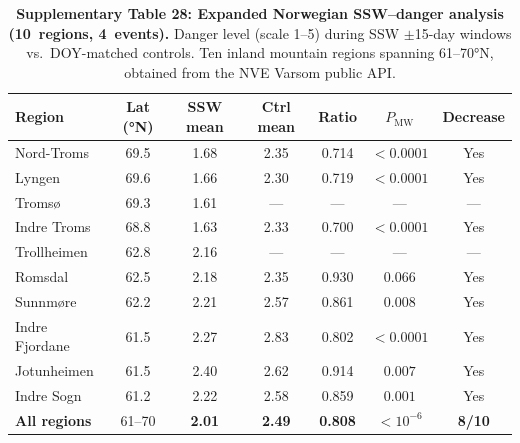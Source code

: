 \begin{table}[htbp]
\caption{\textbf{Supplementary Table 28: Expanded Norwegian SSW--danger analysis (10~regions, 4~events).}
Danger level (scale 1--5) during SSW $\pm$15-day windows vs.\ DOY-matched controls. Ten inland mountain regions spanning 61--70°N, obtained from the NVE Varsom public API.}
\label{tab:norway_expanded}
\small
\begin{tabular}{lcccccc}
\toprule
Region & Lat (°N) & SSW mean & Ctrl mean & Ratio & $P_{\mathrm{MW}}$ & Decrease \\
\midrule
Nord-Troms & 69.5 & 1.68 & 2.35 & 0.714 & $< 0.0001$ & Yes \\
Lyngen & 69.6 & 1.66 & 2.30 & 0.719 & $< 0.0001$ & Yes \\
Tromsø & 69.3 & 1.61 & --- & --- & --- & --- \\
Indre Troms & 68.8 & 1.63 & 2.33 & 0.700 & $< 0.0001$ & Yes \\
Trollheimen & 62.8 & 2.16 & --- & --- & --- & --- \\
Romsdal & 62.5 & 2.18 & 2.35 & 0.930 & $0.066$ & Yes \\
Sunnmøre & 62.2 & 2.21 & 2.57 & 0.861 & $0.008$ & Yes \\
Indre Fjordane & 61.5 & 2.27 & 2.83 & 0.802 & $< 0.0001$ & Yes \\
Jotunheimen & 61.5 & 2.40 & 2.62 & 0.914 & $0.007$ & Yes \\
Indre Sogn & 61.2 & 2.22 & 2.58 & 0.859 & $0.001$ & Yes \\
\midrule
\textbf{All regions} & 61--70 & \textbf{2.01} & \textbf{2.49} & \textbf{0.808} & $< 10^{-6}$ & \textbf{8/10} \\
\bottomrule
\end{tabular}
\end{table}


